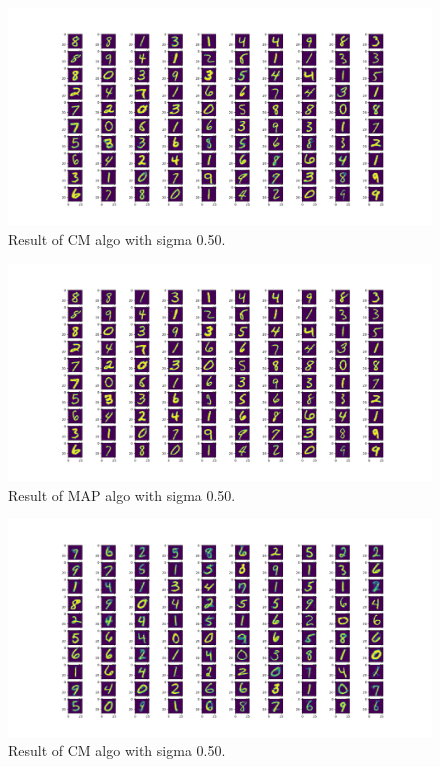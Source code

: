 \documentclass{article}
\begin{document}
\begin{figure}[h]
  \includegraphics[width=\linewidth]{sigma_050_cm.png}
  \caption{Result of CM algo with sigma 0.50.}
  \label{fig:cm050}
\end{figure}

\begin{figure}[h]
  \includegraphics[width=\linewidth]{sigma_050_map.png}
  \caption{Result of MAP algo with sigma 0.50.}
  \label{fig:map050}
\end{figure}

\begin{figure}[h]
  \includegraphics[width=\linewidth]{sigma_100_cm.png}
  \caption{Result of CM algo with sigma 0.50.}
  \label{fig:cm100}
\end{figure}
\end{document}
